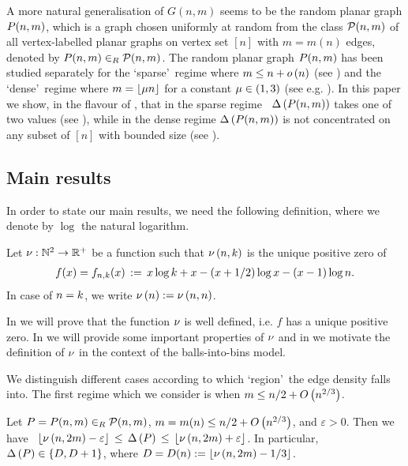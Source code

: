 A more natural generalisation of $G(n,m)$ seems to be the random planar graph $P(n,m)$, which is a graph chosen uniformly at random from the class $\mathcal{P}(n,m)$ of all vertex-labelled planar graphs on vertex set $[n]$ with $m=m(n)$ edges, denoted by $P(n,m)\in_R \mathcal{P}(n,m)$. The random planar graph $P(n,m)$ has been studied separately for the \lq sparse\rq\ regime where $m\leq n+o\left(n\right)$ (see \cite{KangLuczak2012,KangMosshammerSpruessel2020}) and the \lq dense\rq\ regime where $m=\left\lfloor\mu n\right\rfloor$ for a constant $\mu\in (1,3)$ (see e.g. \cite{GimenezNoy2009}). In this paper we show, in the flavour of , that in the sparse regime \whp\ $\Delta\left(P(n,m)\right)$ takes one of two values (see ), while in the dense regime $\Delta\left(P(n,m)\right)$ is not concentrated on any subset of $[n]$ with bounded size (see ).

\subsection{Main results}\label{MDsubsec:main}
In order to state our main results, we need the following definition, where we denote by $\log$ the natural logarithm.
\begin{definition}\label{MDdef:nu}
	Let $\nu:\mathbb{N}^2\to \mathbb{R}^+$ be a function such that $\nu\left(n, k\right)$ is the unique positive zero of
	\begin{align*}
	f(x)=f_{n, k}(x)\hspace{0.06cm}:=\hspace{0.06cm} x\log k+x-(x+1/2)\log x-(x-1)\log n.
	\end{align*}
	In case of $n=k$, we write $\nu\left(n\right):=\nu\left(n, n\right)$.
\end{definition}
In  we will prove that the function $\nu$ is well defined, i.e. $f$ has a unique positive zero. In  we will provide some important properties of $\nu$ and in  we motivate the definition of $\nu$ in the context of the balls-into-bins model.

We distinguish different cases according to which \lq region\rq\ the edge density falls into. The first regime which we consider is when $m\leq n/2+O\left(n^{2/3}\right)$.

\begin{thm}\label{MDthm:main_sub}
Let $P=P(n,m)\in_R \mathcal{P}(n,m)$, $m=m(n)\leq n/2+O\left(n^{2/3}\right)$, and $\varepsilon>0$. Then we have \whp\ $\left\lfloor\nu\left(n, 2m\right)-\varepsilon\right\rfloor\hspace{0.06cm}\leq\hspace{0.06cm} \Delta\left(P\right)\hspace{0.06cm}\leq\hspace{0.06cm} \left\lfloor\nu\left(n, 2m\right)+\varepsilon\right\rfloor$. In particular, \whp\ $\Delta\left(P\right)\in \left\{D, D+1\right\}$, where $D=D(n):=\left\lfloor\nu\left(n, 2m\right)-1/3\right\rfloor$.
\end{thm}

